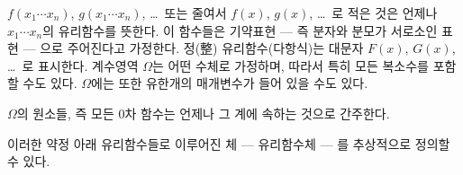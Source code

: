 
$f(x_1\cdots x_n)$, $g(x_1\cdots x_n)$, \ldots\ 또는 줄여서 $f(x)$, $g(x)$, \ldots\ 로 적은 것은 언제나 $x_1\cdots x_n$의 유리함수를 뜻한다. 이 함수들은 기약표현 --- 즉 분자와 분모가 서로소인 표현 --- 으로 주어진다고 가정한다. 정(整) 유리함수(다항식)는 대문자 $F(x)$, $G(x)$, \ldots\ 로 표시한다. 계수영역 $\Omega$는 어떤 수체로 가정하며, 따라서 특히 모든 복소수를 포함할 수도 있다. $\Omega$에는 또한 유한개의 매개변수가 들어 있을 수도 있다.

$\Omega$의 원소들, 즉 모든 0차 함수는 언제나 그 계에 속하는 것으로 간주한다.

이러한 약정 아래 유리함수들로 이루어진 체 --- 유리함수체 --- 를 추상적으로 정의할 수 있다.

